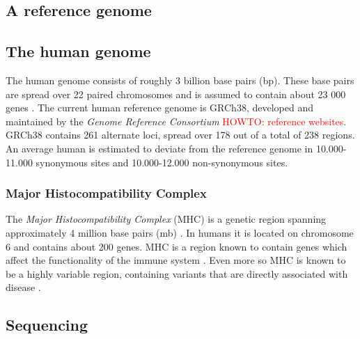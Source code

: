 \documentclass[thesis.tex]{subfiles}
\begin{document}
\subsection{A reference genome}
\subsection{The human genome}
The human genome consists of roughly 3 billion base pairs (bp). These base pairs are spread over 22 paired chromosomes and is assumed to contain about 23 000 genes \cite{introduction_to_genomics}. The current human reference genome is GRCh38, developed and maintained by the \textit{Genome Reference Consortium} \textcolor{red}{HOWTO: reference websites}. GRCh38 contains 261 alternate loci, spread over 178 out of a total of 238 regions. An average human is estimated to deviate from the reference genome in 10.000-11.000 synonymous sites and 10.000-12.000 non-synonymous sites.
\subsubsection{Major Histocompatibility Complex}
The \textit{Major Histocompatibility Complex} (MHC) is a genetic region spanning approximately 4 million base pairs (mb) \cite{immunobiology_the_immune_system_in_health_and_disease}. In humans it is located on chromosome 6 and contains about 200 genes. MHC is a region known to contain genes which affect the functionality of the immune system \cite{the_importance_of_immune_gene_variability_in_evolutionary_ecology_and_conservation}. Even more so MHC is known to be a highly variable region, containing variants that are directly associated with disease \cite{variation_analysis_and_gene_annotation_of_eight_mhc_haplotypes}.
\subsection{Sequencing}
\end{document}
